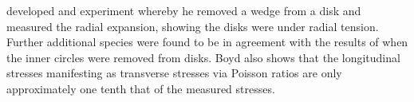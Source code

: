 \cite{boyd1950a} developed and experiment whereby he removed a wedge from a disk
and measured the radial expansion, showing the disks were under radial
tension. Further additional species were found to be in agreement with the
results of \cite{jacobs1945l} when the inner circles were removed from disks. Boyd also shows
that the longitudinal stresses manifesting as transverse stresses via Poisson
ratios are only approximately one tenth that of the measured stresses.